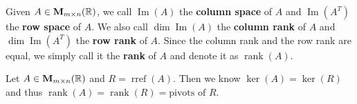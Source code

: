 	\begin{definitionenv}
		Given $A\in \mathbf{M}_{m \times n}(\mathbb{R})$, we call $\operatorname{Im}(A)$ the \textbf{column space} of $A$ and $\operatorname{Im}(A^T)$ the \textbf{row space} of $A$. We also call $\dim \operatorname{Im}(A)$ the \textbf{column rank} of $A$ and $\dim \operatorname{Im}(A^T)$ the \textbf{row rank} of $A$. Since the column rank and the row rank are equal, we simply call it the \textbf{rank} of $A$ and denote it as $\operatorname{rank}(A)$.
	\end{definitionenv}
	\begin{remarkenv}
		Let $A\in \mathbf{M}_{m \times n}(\mathbb{R})$ and $R=\operatorname{rref}(A)$. Then we know $\ker(A) = \ker(R)$ and thus $\operatorname{rank}(A) = \operatorname{rank}(R)=\text{pivots of } R$.
	\end{remarkenv}

